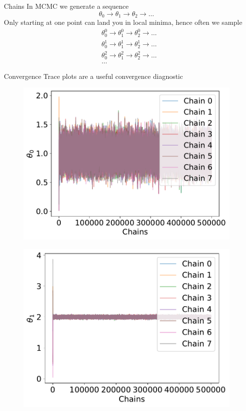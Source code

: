 \documentclass[
aspectratio=169,
14pt,
professionalfonts
]{beamer}
\begin{document}
\begin{frame}{Chains}
    In MCMC we generate a sequence
    $$
    \theta_0 \to \theta_1 \to \theta_2 \to \ldots
    $$
    Only starting at one point can land you in local minima, hence often we sample
    \begin{align*}
        &\theta_0^0 \to \theta_1^0 \to \theta_2^0 \to \ldots \\
        &\theta_0^1 \to \theta_1^1 \to \theta_2^1 \to \ldots \\
        &\theta_0^2 \to \theta_1^2 \to \theta_2^2 \to \ldots \\
        &\ldots
    \end{align*}
\end{frame}

\begin{frame}{Convergence}
    Trace plots are a useful convergence diagnostic
    \begin{minipage}[t]{0.49\linewidth}
    \begin{figure}
        \centering
        \includegraphics[width=\linewidth]{../plots/trace_theta0.pdf}
    \end{figure}
    \end{minipage}
    \begin{minipage}[t]{0.49\linewidth}
    \begin{figure}
        \centering
        \includegraphics[width=\linewidth]{../plots/trace_theta1.pdf}

\end{figure}
\end{minipage}
\end{frame}
\end{document}
